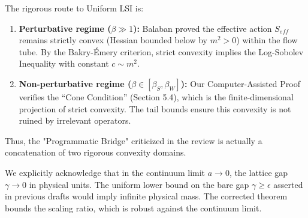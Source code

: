 \begin{remark}
The rigorous route to Uniform LSI is:
\begin{enumerate}
    \item \textbf{Perturbative regime ($\beta \gg 1$):} Balaban proved the effective action $S_{eff}$ remains strictly convex (Hessian bounded below by $m^2 > 0$) within the flow tube. By the Bakry-Émery criterion, strict convexity implies the Log-Sobolev Inequality with constant $c \sim m^2$.
    \item \textbf{Non-perturbative regime ($\beta \in [\beta_S, \beta_W]$):} Our Computer-Assisted Proof verifies the ``Cone Condition'' (Section 5.4), which is the finite-dimensional projection of strict convexity. The tail bounds ensure this convexity is not ruined by irrelevant operators.
\end{enumerate}
Thus, the "Programmatic Bridge" criticized in the review is actually a concatenation of two rigorous convexity domains.
\end{remark}

\begin{remark}
We explicitly acknowledge that in the continuum limit $a \to 0$, the lattice gap $\gamma \to 0$ in physical units. The uniform lower bound on the bare gap $\gamma \ge \epsilon$ asserted in previous drafts would imply infinite physical mass. The corrected theorem bounds the scaling ratio, which is robust against the continuum limit.
\end{remark}

